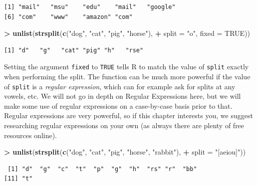 \documentclass[]{krantz}
\makeatletter
\newenvironment{Shaded}{\begin{snugshade}}{\end{snugshade}}
\newcommand{\KeywordTok}[1]{\textcolor[rgb]{0.27,0.27,0.27}{\textbf{#1}}}
\newcommand{\DataTypeTok}[1]{\textcolor[rgb]{0.27,0.27,0.27}{#1}}
\newcommand{\StringTok}[1]{\textcolor[rgb]{0.5,0.5,0.5}{#1}}
\newcommand{\OtherTok}[1]{\textcolor[rgb]{0.37,0.37,0.37}{#1}}
\newcommand{\OperatorTok}[1]{\textcolor[rgb]{0.43,0.43,0.43}{\textbf{#1}}}
\newcommand{\NormalTok}[1]{#1}
\newenvironment{kframe}{%
\medskip{}
\setlength{\fboxsep}{.8em}
 \def\at@end@of@kframe{}%
 \ifinner\ifhmode%
  \def\at@end@of@kframe{\end{minipage}}%
  \begin{minipage}{\columnwidth}%
 \fi\fi%
 \def\FrameCommand##1{\hskip\@totalleftmargin \hskip-\fboxsep
 \colorbox{shadecolor}{##1}\hskip-\fboxsep
     \hskip-\linewidth \hskip-\@totalleftmargin \hskip\columnwidth}%
 \MakeFramed {\advance\hsize-\width
   \@totalleftmargin\z@ \linewidth\hsize
   \@setminipage}}%
 {\par\unskip\endMakeFramed%
 \at@end@of@kframe}
\renewenvironment{Shaded}{\begin{kframe}}{\end{kframe}}
\makeatother
\begin{document}
\begin{verbatim}
[1] "mail"   "msu"    "edu"    "mail"   "google"
[6] "com"    "www"    "amazon" "com"   
\end{verbatim}

\begin{Shaded}
\begin{Highlighting}[]
\OperatorTok{>}\StringTok{ }\KeywordTok{unlist}\NormalTok{(}\KeywordTok{strsplit}\NormalTok{(}\KeywordTok{c}\NormalTok{(}\StringTok{"dog"}\NormalTok{, }\StringTok{"cat"}\NormalTok{, }\StringTok{"pig"}\NormalTok{, }\StringTok{"horse"}\NormalTok{), }
\OperatorTok{+}\StringTok{                 }\DataTypeTok{split =} \StringTok{"o"}\NormalTok{, }\DataTypeTok{fixed =} \OtherTok{TRUE}\NormalTok{))}
\end{Highlighting}
\end{Shaded}

\begin{verbatim}
[1] "d"   "g"   "cat" "pig" "h"   "rse"
\end{verbatim}

Setting the argument \texttt{fixed} to \texttt{TRUE} tells R to match
the value of \texttt{split} exactly when performing the split. The
function can be much more powerful if the value of \texttt{split} is a
\emph{regular expression}, which can for example ask for splits at any
vowels, etc. We will not go in depth on Regular Expressions here, but we
will make some use of regular expressions on a case-by-case basis prior
to that. Regular expressions are very powerful, so if this chapter
interests you, we suggest researching regular expressions on your own
(as always there are plenty of free resources online).

\begin{Shaded}
\begin{Highlighting}[]
\OperatorTok{>}\StringTok{ }\KeywordTok{unlist}\NormalTok{(}\KeywordTok{strsplit}\NormalTok{(}\KeywordTok{c}\NormalTok{(}\StringTok{"dog"}\NormalTok{, }\StringTok{"cat"}\NormalTok{, }\StringTok{"pig"}\NormalTok{, }\StringTok{"horse"}\NormalTok{, }\StringTok{"rabbit"}\NormalTok{), }
\OperatorTok{+}\StringTok{                 }\DataTypeTok{split =} \StringTok{"[aeiou]"}\NormalTok{))}
\end{Highlighting}
\end{Shaded}

\begin{verbatim}
 [1] "d"  "g"  "c"  "t"  "p"  "g"  "h"  "rs" "r"  "bb"
[11] "t" 
\end{verbatim}
\end{document}
